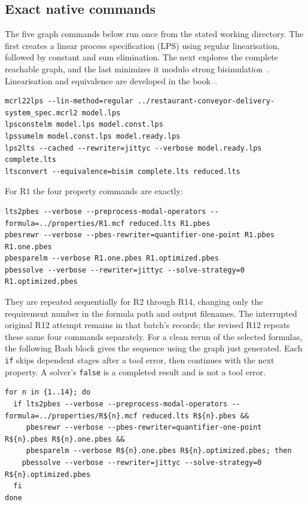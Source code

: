 \documentclass[11pt,a4paper]{article}
\begin{document}
\subsection{Exact native commands}
The five graph commands below run once from the stated working directory. The first creates a linear process specification (LPS) using regular linearisation, followed by constant and sum elimination. The next explores the complete reachable graph, and the last minimizes it modulo strong bisimulation~\cite{mcrl22lps,lpsconstelm,lpssumelm,lps2lts,ltsconvert}. Linearisation and equivalence are developed in the book~\cite[Chs.~2, 6 and 10]{book}.
\begin{lstlisting}[style=commands,caption={Shared graph generation and reduction.},label={lst:graphcommands}]
mcrl22lps --lin-method=regular ../restaurant-conveyor-delivery-system_spec.mcrl2 model.lps
lpsconstelm model.lps model.const.lps
lpssumelm model.const.lps model.ready.lps
lps2lts --cached --rewriter=jittyc --verbose model.ready.lps complete.lts
ltsconvert --equivalence=bisim complete.lts reduced.lts
\end{lstlisting}
\Needspace{150pt}
For R1 the four property commands are exactly:
\begin{lstlisting}[style=commands,caption={Whole-formula native verification of R1.},label={lst:propertycommands}]
lts2pbes --verbose --preprocess-modal-operators --formula=../properties/R1.mcf reduced.lts R1.pbes
pbesrewr --verbose --pbes-rewriter=quantifier-one-point R1.pbes R1.one.pbes
pbesparelm --verbose R1.one.pbes R1.optimized.pbes
pbessolve --verbose --rewriter=jittyc --solve-strategy=0 R1.optimized.pbes
\end{lstlisting}
They are repeated sequentially for R2 through R14, changing only the requirement number in the formula path and output filenames. The interrupted original R12 attempt remains in that batch's records; the revised R12 repeats these same four commands separately. For a clean rerun of the selected formulas, the following Bash block gives the sequence using the graph just generated. Each \texttt{if} skips dependent stages after a tool error, then continues with the next property. A solver's \texttt{false} is a completed result and is not a tool error.
\begin{lstlisting}[style=commands,caption={Sequential checks of all fourteen whole formulas.},label={lst:batchcommands}]
for n in {1..14}; do
  if lts2pbes --verbose --preprocess-modal-operators --formula=../properties/R${n}.mcf reduced.lts R${n}.pbes &&
     pbesrewr --verbose --pbes-rewriter=quantifier-one-point R${n}.pbes R${n}.one.pbes &&
     pbesparelm --verbose R${n}.one.pbes R${n}.optimized.pbes; then
    pbessolve --verbose --rewriter=jittyc --solve-strategy=0 R${n}.optimized.pbes
  fi
done
\end{lstlisting}
\end{document}
